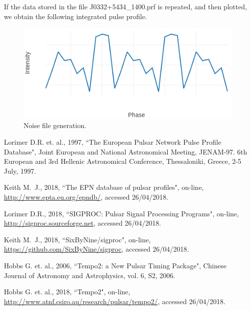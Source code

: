 \documentclass[preprint,authoryear,5p,twocolumn]{elsarticle_mod}
\begin{document}
If the data stored in the file J0332+5434\_1400.prf is repeated, and then plotted, we obtain the following integrated pulse profile. 
\begin{figure}
	\centering
		\includegraphics[scale=0.4]{images/png/SimulatedPulse.png}
		\caption[]{Noise file generation.}
	\label{Fig:Noise}
\end{figure}

\begin{thebibliography}{1}
{Lorimer} D.R. et. al., 1997, ``The European Pulsar Network Pulse Profile Database", Joint European and National Astronomical Meeting, JENAM-97. 6th European and 3rd Hellenic Astronomical Conference, Thessaloniki, Greece, 2-5 July, 1997.

{Keith} M.~J., 2018, ``The EPN database of pulsar profiles", on-line, \url{http://www.epta.eu.org/epndb/}, accessed 26/04/2018.

{Lorimer} D.R., 2018, ``SIGPROC: Pulsar Signal Processing Programs", on-line, \url{http://sigproc.sourceforge.net}, accessed 26/04/2018.

{Keith} M.~J., 2018, ``SixByNine/sigproc", on-line, \url{https://github.com/SixByNine/sigproc}, accessed 26/04/2018.

{Hobbs} G. et. al., 2006, ``Tempo2: a New Pulsar Timing Package", Chinese Journal of Astronomy and Astrophysics, vol. 6, S2, 2006. 

{Hobbs} G. et. al., 2018, ``Tempo2", on-line, \url{http://www.atnf.csiro.au/research/pulsar/tempo2/}, accessed 26/04/2018. 

\end{thebibliography}
\end{document}
